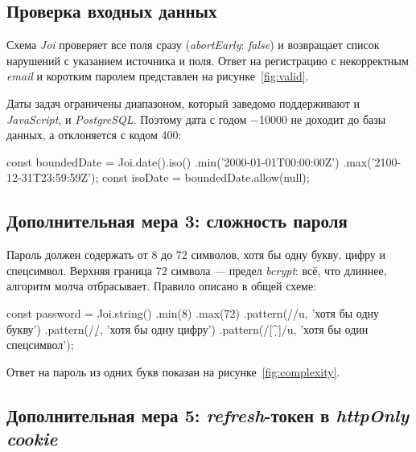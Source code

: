\documentclass{stp}
\begin{document}

\subsection{Проверка входных данных}

Схема \textit{Joi} проверяет все поля сразу (\textit{abortEarly}: \textit{false}) и возвращает
список нарушений с указанием источника и поля. Ответ на регистрацию с
некорректным \textit{email} и коротким паролем представлен на
рисунке~\ref{fig:valid}.

Даты задач ограничены диапазоном, который заведомо поддерживают и
\textit{JavaScript}, и \textit{PostgreSQL}. Поэтому дата с годом −10000 не доходит
до базы данных, а отклоняется с кодом 400:

\begin{stplisting}
const boundedDate = Joi.date().iso()
  .min('2000-01-01T00:00:00Z')
  .max('2100-12-31T23:59:59Z');
const isoDate = boundedDate.allow(null);
\end{stplisting}


\subsection{Дополнительная мера 3: сложность пароля}

Пароль должен содержать от 8 до 72 символов, хотя бы одну букву, цифру
и спецсимвол. Верхняя граница 72 символа — предел \textit{bcrypt}: всё, что
длиннее, алгоритм молча отбрасывает. Правило описано в общей схеме:

\begin{stplisting}
const password = Joi.string()
  .min(8)
  .max(72)
  .pattern(//u, 'хотя бы одну букву')
  .pattern(/\d/, 'хотя бы одну цифру')
  .pattern(/[^\d\s]/u, 'хотя бы один спецсимвол');
\end{stplisting}

Ответ на пароль из одних букв показан на рисунке~\ref{fig:complexity}.


\subsection{Дополнительная мера 5: \textit{refresh}-токен в \textit{httpOnly cookie}}
\end{document}
